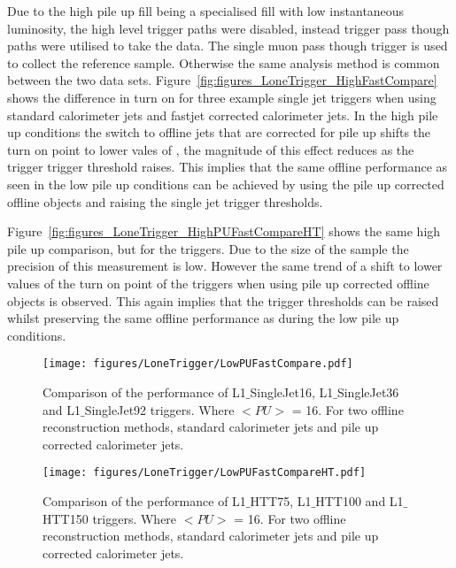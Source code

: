 Due to the high pile up fill being a specialised fill with low instantaneous 
luminosity, the high level trigger paths were disabled, instead \Lone trigger 
pass though paths were utilised to take the data. The \Lone single muon pass 
though trigger is used to collect the reference sample. Otherwise the same 
analysis method is common between the two data sets.
Figure~\ref{fig:figures_LoneTrigger_HighFastCompare} shows the difference in 
turn on for three example \Lone single jet triggers when using standard 
calorimeter jets and fastjet corrected calorimeter jets.
In the high pile up conditions the switch to offline jets that are corrected 
for pile up shifts the turn on point to lower vales of \ET, the magnitude of 
this effect reduces as the \Lone trigger trigger threshold raises. This implies 
that the same offline performance as seen in the low pile up conditions can be 
achieved by using the pile up corrected offline objects and raising the \Lone 
single jet trigger thresholds.

Figure~\ref{fig:figures_LoneTrigger_HighPUFastCompareHT} shows the same high 
pile up comparison, but for the \Lone \HT triggers. Due to the size of the 
sample the precision of this measurement is low. However the same trend of a 
shift to lower \HT values of the turn on point of the \Lone triggers when using 
pile up corrected offline objects is observed. This again implies that the 
\Lone \HT trigger thresholds can be raised whilst preserving the same offline 
performance as during the low pile up conditions.

\begin{figure}[htbp]
  \centering
    \texttt{[image: figures/LoneTrigger/LowPUFastCompare.pdf]}
  \caption{Comparison of the performance of  L1$\_$SingleJet16, L1$\_$SingleJet36 and  L1$\_$SingleJet92 triggers. Where $<PU>$ = 16. For two offline reconstruction methods, standard \AK calorimeter jets and pile up corrected \AK calorimeter jets.}
  \label{fig:figures_LoneTrigger_LowPUFastCompare}
\end{figure}


\begin{figure}[htbp]
  \centering
    \texttt{[image: figures/LoneTrigger/LowPUFastCompareHT.pdf]}
  \caption{Comparison of the performance of L1$\_$HTT75, L1$\_$HTT100 and  L1$\_$HTT150 triggers. Where $<PU>$ = 16. For two offline reconstruction methods, standard \AK calorimeter jets and pile up corrected \AK calorimeter jets.}
  \label{fig:figures_LoneTrigger_LowPUFastCompareHT}
\end{figure}


